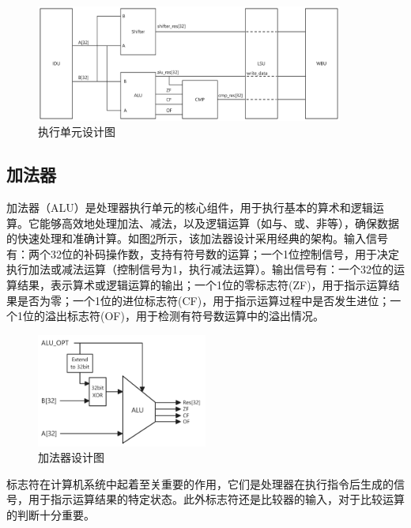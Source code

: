 \begin{figure}[htbp]
	\centering
	\includegraphics[width=0.9\textwidth]{image/exu.pdf}
	\caption{执行单元设计图}
	\label{fig:exu}
\end{figure}

\subsection{加法器}

加法器（ALU）是处理器执行单元的核心组件，用于执行基本的算术和逻辑运算。它能够高效地处理加法、减法，以及逻辑运算（如与、或、非等），确保数据的快速处理和准确计算。如图\ref{fig:alu}所示，该加法器设计采用经典的架构。输入信号有：两个32位的补码操作数，支持有符号数的运算；一个1位控制信号，用于决定执行加法或减法运算（控制信号为1，执行减法运算）。输出信号有：一个32位的运算结果，表示算术或逻辑运算的输出；一个1位的零标志符(ZF)，用于指示运算结果是否为零；一个1位的进位标志符(CF)，用于指示运算过程中是否发生进位；一个1位的溢出标志符(OF)，用于检测有符号数运算中的溢出情况。

\begin{figure}[htbp]
	\centering
	\includegraphics[width=0.5\textwidth]{image/alu.pdf}
	\caption{加法器设计图}
	\label{fig:alu}
\end{figure}

标志符在计算机系统中起着至关重要的作用，它们是处理器在执行指令后生成的信号，用于指示运算结果的特定状态。此外标志符还是比较器的输入，对于比较运算的判断十分重要。

